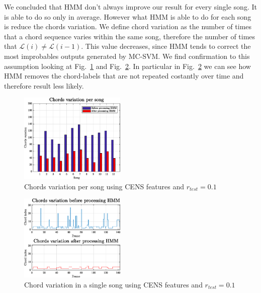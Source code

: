 We concluded that HMM don't always improve our result for every single song. It is able to do so only in average. However what HMM is able to do for each song is reduce the chords variation. We define chord variation as the number of times that a chord sequence varies within the same song, therefore the number of times that $\mathcal{L}(i) \neq \mathcal{L}(i-1)$. This value decreases, since HMM tends to correct the most improbables outputs generated by MC-SVM. We find confirmation to this assumption looking at
Fig.~\ref{fig:smoothmulti} and Fig.~\ref{fig:smoothsingle}. In particular in Fig.~\ref{fig:smoothsingle} we can see how HMM removes the chord-labels that are not repeated costantly over time and therefore result less likely.

\begin{figure} [h!]
	\centering
	\includegraphics[width=0.45\textwidth]{img/Result_HMM/SMOOTHING/SmoothPerSongCENS0109}
	\caption{Chords variation per song using CENS features and $r_{test}=0.1$}
	\label{fig:smoothmulti}
\end{figure}

\begin{figure} [h!]
	\centering
	\includegraphics[width=0.45\textwidth]{img/Result_HMM/SMOOTHING/SmoothSingleSongCENS0109}
	\caption{Chord variation in a single song using CENS features and $r_{test}=0.1$}
	\label{fig:smoothsingle}
\end{figure}
